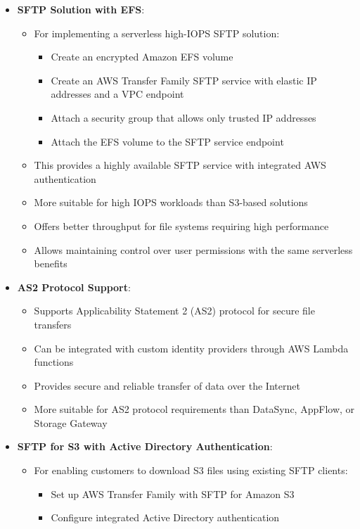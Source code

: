 \documentclass[11pt,a4paper]{report}
\begin{document}
\begin{itemize}
  \item \textbf{SFTP Solution with EFS}:
\begin{itemize}
  \item For implementing a serverless high-IOPS SFTP solution:
\begin{itemize}
  \item Create an encrypted Amazon EFS volume
  \item Create an AWS Transfer Family SFTP service with elastic IP addresses and a VPC endpoint
  \item Attach a security group that allows only trusted IP addresses
  \item Attach the EFS volume to the SFTP service endpoint
\end{itemize}
  \item This provides a highly available SFTP service with integrated AWS authentication
  \item More suitable for high IOPS workloads than S3-based solutions
  \item Offers better throughput for file systems requiring high performance
  \item Allows maintaining control over user permissions with the same serverless benefits
\end{itemize}
  \item \textbf{AS2 Protocol Support}:
\begin{itemize}
  \item Supports Applicability Statement 2 (AS2) protocol for secure file transfers
  \item Can be integrated with custom identity providers through AWS Lambda functions
  \item Provides secure and reliable transfer of data over the Internet
  \item More suitable for AS2 protocol requirements than DataSync, AppFlow, or Storage Gateway
\end{itemize}
  \item \textbf{SFTP for S3 with Active Directory Authentication}:
\begin{itemize}
  \item For enabling customers to download S3 files using existing SFTP clients:
\begin{itemize}
  \item Set up AWS Transfer Family with SFTP for Amazon S3
  \item Configure integrated Active Directory authentication

\end{itemize}
\end{itemize}
\end{itemize}
\end{document}

